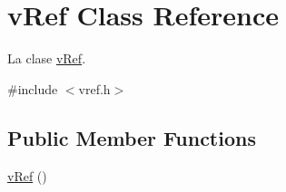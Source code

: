 \hypertarget{classv_ref}{\section{v\-Ref Class Reference}
\label{classv_ref}
}


La clase \hyperlink{classv_ref}{v\-Ref}.  




{\ttfamily \#include $<$vref.\-h$>$}

\subsection*{Public Member Functions}
\begin{DoxyCompactItemize}
\item 
\hypertarget{classv_ref_ac2b5f44f695eef09cc28e3dd07fc1026}{\hyperlink{classv_ref_ac2b5f44f695eef09cc28e3dd07fc1026}{v\-Ref} ()}\label{classv_ref_ac2b5f44f695eef09cc28e3dd07fc1026}


\end{DoxyCompactItemize}
